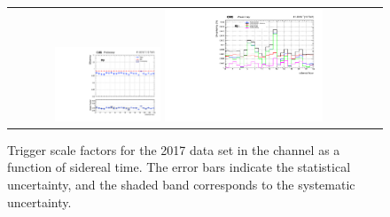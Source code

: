 \begin{figure}[htb]
  \begin{center}
    \begin{tabular}{cc}
      \includegraphics[width=0.30\textwidth]{fig_2017_sidereal/g_emu_sidereal_FullSystUncBand.pdf}
      \includegraphics[width=0.45\textwidth]{fig_2017_sidereal/g_emu_sidereal_ErrorsBreakdown.pdf}\\
    \end{tabular}
    \caption{Trigger scale factors for the 2017 data set in the \emu channel as a function of sidereal time.
            The error bars indicate the statistical uncertainty, and the shaded band corresponds to the systematic uncertainty.
            }
    \label{TrigSF_SideReal_2017_1}
  \end{center}
\end{figure}

\clearpage